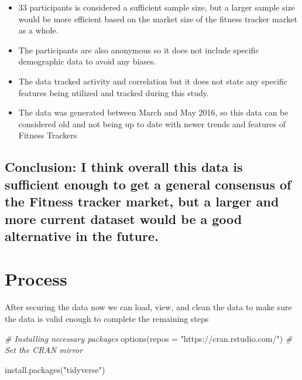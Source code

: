 \documentclass[
]{article}
\newenvironment{Shaded}{\begin{snugshade}}{\end{snugshade}}
\newcommand{\AttributeTok}[1]{\textcolor[rgb]{0.77,0.63,0.00}{#1}}
\newcommand{\CommentTok}[1]{\textcolor[rgb]{0.56,0.35,0.01}{\textit{#1}}}
\newcommand{\FunctionTok}[1]{\textcolor[rgb]{0.00,0.00,0.00}{#1}}
\newcommand{\NormalTok}[1]{#1}
\newcommand{\StringTok}[1]{\textcolor[rgb]{0.31,0.60,0.02}{#1}}
\providecommand{\tightlist}{%
  \setlength{\itemsep}{0pt}\setlength{\parskip}{0pt}}
\begin{document}
\begin{itemize}
\tightlist
\item
  33 participants is considered a sufficient sample size, but a larger
  sample size would be more efficient based on the market size of the
  fitness tracker market as a whole.
\item
  The participants are also anonymous so it does not include specific
  demographic data to avoid any biases.
\item
  The data tracked activity and correlation but it does not state any
  specific features being utilized and tracked during this study.
\item
  The data was generated between March and May 2016, so this data can be
  considered old and not being up to date with newer trends and features
  of Fitness Trackers
\end{itemize}

\hypertarget{conclusion-i-think-overall-this-data-is-sufficient-enough-to-get-a-general-consensus-of-the-fitness-tracker-market-but-a-larger-and-more-current-dataset-would-be-a-good-alternative-in-the-future.}{%
\subsection{\texorpdfstring{\textbf{Conclusion:} I think overall this
data is sufficient enough to get a general consensus of the Fitness
tracker market, but a larger and more current dataset would be a good
alternative in the
future.}{Conclusion: I think overall this data is sufficient enough to get a general consensus of the Fitness tracker market, but a larger and more current dataset would be a good alternative in the future.}}\label{conclusion-i-think-overall-this-data-is-sufficient-enough-to-get-a-general-consensus-of-the-fitness-tracker-market-but-a-larger-and-more-current-dataset-would-be-a-good-alternative-in-the-future.}}

\hypertarget{process}{%
\section{\texorpdfstring{\textbf{Process}}{Process}}\label{process}}

After securing the data now we can load, view, and clean the data to
make sure the data is valid enough to complete the remaining steps

\begin{Shaded}
\begin{Highlighting}[]
\CommentTok{\# Installing necessary packages}
\FunctionTok{options}\NormalTok{(}\AttributeTok{repos =} \StringTok{"https://cran.rstudio.com/"}\NormalTok{)  }\CommentTok{\# Set the CRAN mirror}

\FunctionTok{install.packages}\NormalTok{(}\StringTok{"tidyverse"}\NormalTok{)}
\end{Highlighting}
\end{Shaded}
\end{document}

